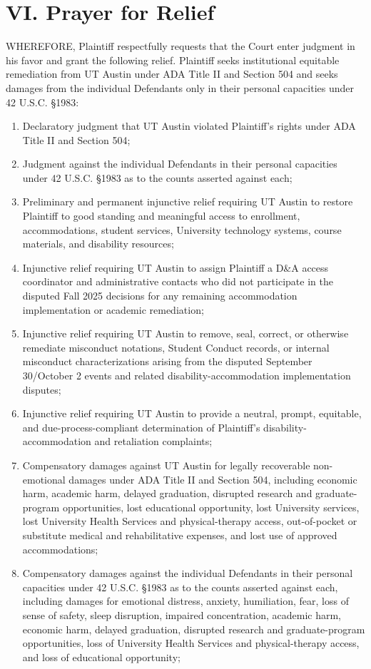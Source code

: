 \documentclass[12pt]{article}
\newcommand{\complaintsection}[1]{%
  \section*{#1}%
  \phantomsection%
  \addcontentsline{toc}{section}{#1}%
}
\begin{document}
\complaintsection{VI. Prayer for Relief}

WHEREFORE, Plaintiff respectfully requests that the Court enter judgment in his favor and grant the following relief. Plaintiff seeks institutional equitable remediation from UT Austin under ADA Title II and Section 504 and seeks damages from the individual Defendants only in their personal capacities under 42 U.S.C. \S 1983:

\begin{enumerate}[label=\Alph*., leftmargin=2.5em]
\item Declaratory judgment that UT Austin violated Plaintiff's rights under ADA Title II and Section 504;
\item Judgment against the individual Defendants in their personal capacities under 42 U.S.C. \S 1983 as to the counts asserted against each;
\item Preliminary and permanent injunctive relief requiring UT Austin to restore Plaintiff to good standing and meaningful access to enrollment, accommodations, student services, University technology systems, course materials, and disability resources;
\item Injunctive relief requiring UT Austin to assign Plaintiff a D\&A access coordinator and administrative contacts who did not participate in the disputed Fall 2025 decisions for any remaining accommodation implementation or academic remediation;
\item Injunctive relief requiring UT Austin to remove, seal, correct, or otherwise remediate misconduct notations, Student Conduct records, or internal misconduct characterizations arising from the disputed September 30/October 2 events and related disability-accommodation implementation disputes;
\item Injunctive relief requiring UT Austin to provide a neutral, prompt, equitable, and due-process-compliant determination of Plaintiff's disability-accommodation and retaliation complaints;
\item Compensatory damages against UT Austin for legally recoverable non-emotional damages under ADA Title II and Section 504, including economic harm, academic harm, delayed graduation, disrupted research and graduate-program opportunities, lost educational opportunity, lost University services, lost University Health Services and physical-therapy access, out-of-pocket or substitute medical and rehabilitative expenses, and lost use of approved accommodations;
\item Compensatory damages against the individual Defendants in their personal capacities under 42 U.S.C. \S 1983 as to the counts asserted against each, including damages for emotional distress, anxiety, humiliation, fear, loss of sense of safety, sleep disruption, impaired concentration, academic harm, economic harm, delayed graduation, disrupted research and graduate-program opportunities, loss of University Health Services and physical-therapy access, and loss of educational opportunity;

\end{enumerate}
\end{document}
